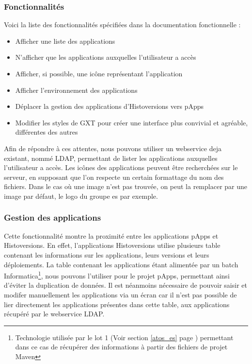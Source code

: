 \documentclass[12pt]{report}
\newcommand{\reference}[1]{(Voir section \ref{#1} page \pageref{#1})}
\begin{document}
    \subsubsection{Fonctionnalités}
    Voici la liste des fonctionnalités spécifiées dans la documentation fonctionnelle :\vspace{-1em}
    \begin{itemize}[itemsep=1pt]
        \item Afficher une liste des applications
        \item N'afficher que les applications auxquelles l'utilisateur a accès
        \item Afficher, si possible, une icône représentant l'application
        \item Afficher l'environnement des applications
        \item Déplacer la gestion des applications d'Histoversions vers pApps
        \item Modifier les styles de GXT pour créer une interface plus convivial et agréable, différentes des autres
    \end{itemize}
    
    Afin de répondre à ces attentes, nous pouvons utiliser un webservice deja existant, nommé LDAP, permettant de lister les applications auxquelles l'utilisateur a accès. Les icônes des applications peuvent être recherchées sur le serveur, en supposant que l'on respecte un certain formattage du nom des fichiers. Dans le cas où une image n'est pas trouvée, on peut la remplacer par une image par défaut, le logo du groupe \acrshort{es} par exemple.
    
    \subsubsection{Gestion des applications}
    
    Cette fonctionnalité montre la proximité entre les applications pApps et Histoversions. En effet, l'applications Histoversions utilise plusieurs table contenant les informations sur les applications, leurs versions et leurs déploiements. La table contenant les applications étant alimentée par un batch Informatica\footnote{Technologie utilisée par le lot 1 \reference{atos_es} permettant dans ce cas de récupérer des informations à partir des fichiers de projet Maven}, nous pouvons l'utiliser pour le projet pApps, permettant ainsi d'éviter la duplication de données. Il est néanmoins nécessaire de pouvoir saisir et modifer manuellement les applications via un écran car il n'est pas possible de lier directement les applications présentes dans cette table, aux applications récupéré par le webservice LDAP.
    
\end{document}

